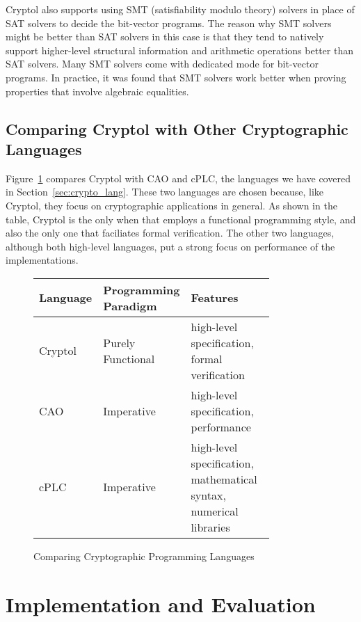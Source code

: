 \documentclass[a4paper, notitlepage]{report}
\begin{document}
Cryptol also supports using SMT (satisfiability modulo theory)
solvers in place of SAT solvers to decide the
bit-vector programs. The reason why SMT solvers might be better than SAT solvers
in this case is that they tend to natively support higher-level structural information
and arithmetic operations better than SAT solvers. Many SMT solvers come with dedicated
mode for bit-vector programs. In practice, it was found that SMT solvers work better
when proving properties that involve algebraic equalities.


\section{Comparing Cryptol with Other Cryptographic Languages}

Figure~\ref{fig:compare} compares Cryptol with CAO and cPLC, the languages we have
covered in Section~\ref{sec:crypto_lang}. These two languages are chosen because,
like Cryptol, they focus on cryptographic applications in general. As shown in the
table, Cryptol is the only when that employs a functional programming style, and
also the only one that faciliates formal verification. The other two languages,
although both high-level languages, put a strong focus on performance of the
implementations.

\begin{figure}
  \begin{center}
    \begin{tabular}{|l | p{0.2\linewidth} | p{0.6\linewidth} |}
      \hline
      Language & Programming Paradigm & Features \\
      \hline
      Cryptol & Purely Functional  & high-level specification, formal verification \\
      \hline
      CAO~\cite{moss2010bridging} & Imperative & high-level specification, performance \\
      \hline
      cPLC~\cite{bangerter2011cplc} & Imperative & high-level specification, mathematical syntax, numerical libraries \\
      \hline
    \end{tabular}
  \end{center}
  \caption{Comparing Cryptographic Programming Languages}
  \label{fig:compare}
\end{figure}



\newpage

\chapter{Implementation and Evaluation}
\end{document}
